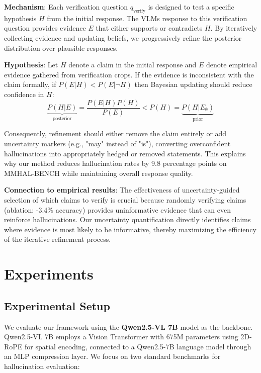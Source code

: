 \documentclass[12pt]{article}
\begin{document}
\vspace{1em}

\textbf{Mechanism}: Each verification question \(q_{\text{verify}}\) is designed to test a specific hypothesis \(H\) from the initial response. The VLMs response to this verification question provides evidence \(E\) that either supports or contradicts \(H\). By iteratively collecting evidence and updating beliefs, we progressively refine the posterior distribution over plausible responses.

\vspace{1em}

\textbf{Hypothesis}: Let \(H\) denote a claim in the initial response and \(E\) denote empirical evidence gathered from verification crops. If the evidence is inconsistent with the claim formally, if \(P(E|H) < P(E|\neg H)\) then Bayesian updating should reduce confidence in \(H\):
\[\underbrace{P(H | E)}_{\text{posterior}} = \frac{P(E|H) P(H)}{P(E)} < P(H) = \underbrace{P(H | E_{\emptyset})}_{\text{prior}}\]

Consequently, refinement should either remove the claim entirely or add uncertainty markers (e.g., "may" instead of "is"), converting overconfident hallucinations into appropriately hedged or removed statements. This explains why our method reduces hallucination rates by 9.8 percentage points on MMHAL-BENCH while maintaining overall response quality.

\vspace{1em}

\textbf{Connection to empirical results}: The effectiveness of uncertainty-guided selection of which claims to verify is crucial because randomly verifying claims (ablation: -3.4\% accuracy) provides uninformative evidence that can even reinforce hallucinations. Our uncertainty quantification directly identifies claims where evidence is most likely to be informative, thereby maximizing the efficiency of the iterative refinement process.


\section{Experiments}

\subsection{Experimental Setup}

We evaluate our framework using the \textbf{Qwen2.5-VL 7B} \citep{wang2024qwen25vl} model as the backbone. Qwen2.5-VL 7B employs a Vision Transformer with 675M parameters using 2D-RoPE for spatial encoding, connected to a Qwen2.5-7B language model through an MLP compression layer. We focus on two standard benchmarks for hallucination evaluation:
\end{document}
